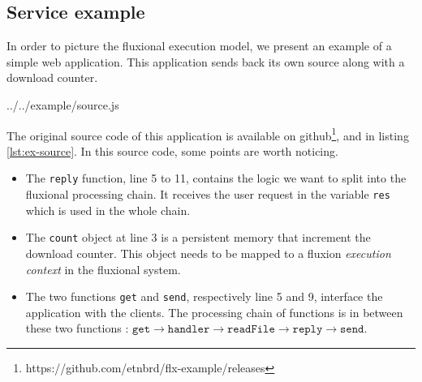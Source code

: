 

\subsection{Service example}

In order to picture the fluxional execution model, we present an example of a simple web application.
This application sends back its own source along with a download counter.

{../../example/source.js}





The original source code of this application is available on github\cite{flx-example}\footnote{\raggedright https://github.com/etnbrd/flx-example/releases}, and in listing \ref{lst:ex-source}.
In this source code, some points are worth noticing.

\begin{itemize}
  \item The \texttt{reply} function, line 5 to 11, contains the logic we want to split into the fluxional processing chain.
  It receives the user request in the variable \texttt{res} which is used in the whole chain.
  \item The \texttt{count} object at line 3 is a persistent memory that increment the download counter.
  This object needs to be mapped to a fluxion \textit{execution context} in the fluxional system.
  \item The two functions \texttt{get} and \texttt{send}, respectively line 5 and 9, interface the application with the clients.
  The processing chain of functions is in between these two functions : $\texttt{get} \to \texttt{handler} \to \texttt{readFile} \to \texttt{reply} \to \texttt{send}$.
\end{itemize}

